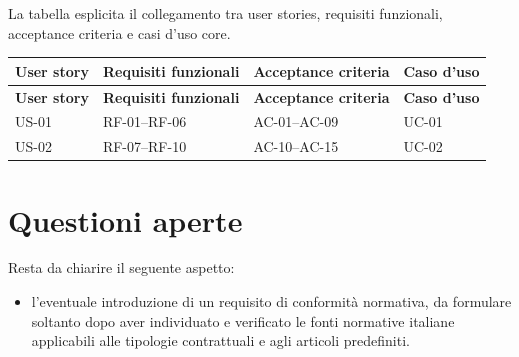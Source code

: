 \documentclass[12pt,a4paper]{article}
\begin{document}
La tabella esplicita il collegamento tra user stories, requisiti funzionali,
acceptance criteria e casi d'uso core.

\begin{longtable}{>{\raggedright\arraybackslash}p{2cm}
                  >{\raggedright\arraybackslash}p{5cm}
                  >{\raggedright\arraybackslash}p{4cm}
                  >{\raggedright\arraybackslash}p{2.5cm}}
\toprule
\textbf{User story} & \textbf{Requisiti funzionali} & \textbf{Acceptance criteria} &
\textbf{Caso d'uso} \\
\midrule
\endfirsthead

\toprule
\textbf{User story} & \textbf{Requisiti funzionali} & \textbf{Acceptance criteria} &
\textbf{Caso d'uso} \\
\midrule
\endhead

US-01 & RF-01--RF-06 & AC-01--AC-09 & UC-01 \\
US-02 & RF-07--RF-10 & AC-10--AC-15 & UC-02 \\

\bottomrule
\end{longtable}

\section{Questioni aperte}

Resta da chiarire il seguente aspetto:

\begin{itemize}
    \item l'eventuale introduzione di un requisito di conformità normativa, da formulare
          soltanto dopo aver individuato e verificato le fonti normative italiane applicabili
          alle tipologie contrattuali e agli articoli predefiniti.
\end{itemize}
\end{document}
